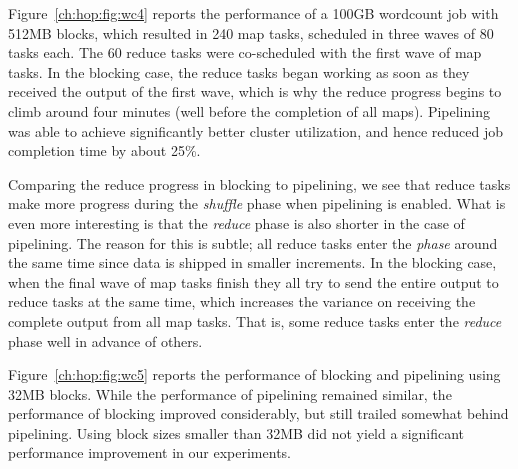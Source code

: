Figure~\ref{ch:hop:fig:wc4} reports the performance of a 100GB wordcount job
with 512MB blocks, which resulted in 240 map tasks, scheduled in three waves of
80 tasks each.  The 60 reduce tasks were co-scheduled with the first wave of map
tasks.  In the blocking case, the reduce tasks began working as soon as they
received the output of the first wave, which is why the reduce progress begins
to climb around four minutes (well before the completion of all maps).
Pipelining was able to achieve significantly better cluster utilization, and
hence reduced job completion time by about 25\%.

Comparing the reduce progress in blocking to pipelining, we see that reduce
tasks make more progress during the {\em shuffle} phase when pipelining is
enabled. What is even more interesting is that the {\em reduce} phase is also
shorter in the case of pipelining. The reason for this is subtle; all reduce
tasks enter the {\em phase} around the same time since data is shipped in
smaller increments. In the blocking case, when the final wave of map tasks
finish they all try to send the entire output to reduce tasks at the same time,
which increases the variance on receiving the complete output from all map
tasks. That is, some reduce tasks enter the {\em reduce} phase well in advance
of others.

Figure~\ref{ch:hop:fig:wc5} reports the performance of blocking and pipelining
using 32MB blocks.  While the performance of pipelining remained similar, the
performance of blocking improved considerably, but still trailed somewhat
behind pipelining.  Using block sizes smaller than 32MB did not yield a
significant performance improvement in our experiments.




